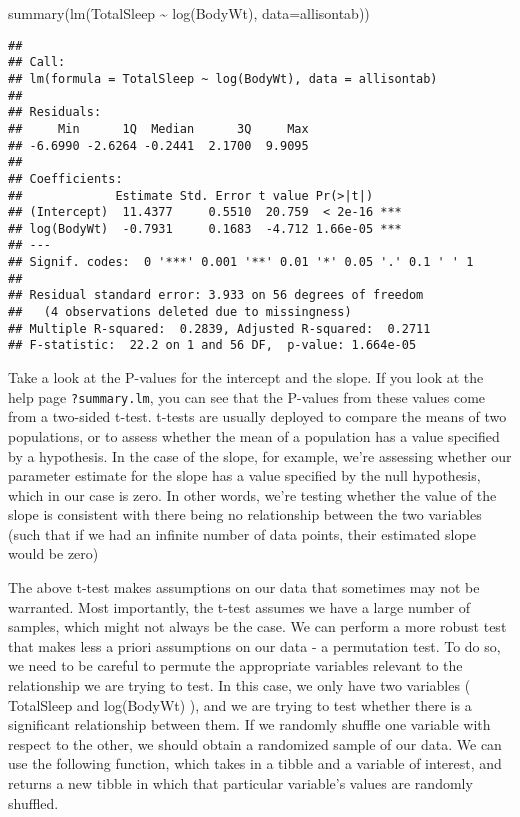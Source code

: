 \documentclass[
]{book}
\newenvironment{Shaded}{\begin{snugshade}}{\end{snugshade}}
\newcommand{\AttributeTok}[1]{\textcolor[rgb]{0.77,0.63,0.00}{#1}}
\newcommand{\FunctionTok}[1]{\textcolor[rgb]{0.00,0.00,0.00}{#1}}
\newcommand{\NormalTok}[1]{#1}
\newcommand{\SpecialCharTok}[1]{\textcolor[rgb]{0.00,0.00,0.00}{#1}}
\begin{document}
\begin{Shaded}
\begin{Highlighting}[]
\FunctionTok{summary}\NormalTok{(}\FunctionTok{lm}\NormalTok{(TotalSleep }\SpecialCharTok{\textasciitilde{}} \FunctionTok{log}\NormalTok{(BodyWt), }\AttributeTok{data=}\NormalTok{allisontab))}
\end{Highlighting}
\end{Shaded}

\begin{verbatim}
## 
## Call:
## lm(formula = TotalSleep ~ log(BodyWt), data = allisontab)
## 
## Residuals:
##     Min      1Q  Median      3Q     Max 
## -6.6990 -2.6264 -0.2441  2.1700  9.9095 
## 
## Coefficients:
##             Estimate Std. Error t value Pr(>|t|)    
## (Intercept)  11.4377     0.5510  20.759  < 2e-16 ***
## log(BodyWt)  -0.7931     0.1683  -4.712 1.66e-05 ***
## ---
## Signif. codes:  0 '***' 0.001 '**' 0.01 '*' 0.05 '.' 0.1 ' ' 1
## 
## Residual standard error: 3.933 on 56 degrees of freedom
##   (4 observations deleted due to missingness)
## Multiple R-squared:  0.2839, Adjusted R-squared:  0.2711 
## F-statistic:  22.2 on 1 and 56 DF,  p-value: 1.664e-05
\end{verbatim}

Take a look at the P-values for the intercept and the slope. If you look at the help page \texttt{?summary.lm}, you can see that the P-values from these values come from a two-sided t-test. t-tests are usually deployed to compare the means of two populations, or to assess whether the mean of a population has a value specified by a hypothesis. In the case of the slope, for example, we're assessing whether our parameter estimate for the slope has a value specified by the null hypothesis, which in our case is zero. In other words, we're testing whether the value of the slope is consistent with there being no relationship between the two variables (such that if we had an infinite number of data points, their estimated slope would be zero)

The above t-test makes assumptions on our data that sometimes may not be warranted. Most importantly, the t-test assumes we have a large number of samples, which might not always be the case. We can perform a more robust test that makes less a priori assumptions on our data - a permutation test. To do so, we need to be careful to permute the appropriate variables relevant to the relationship we are trying to test. In this case, we only have two variables ( TotalSleep and log(BodyWt) ), and we are trying to test whether there is a significant relationship between them. If we randomly shuffle one variable with respect to the other, we should obtain a randomized sample of our data. We can use the following function, which takes in a tibble and a variable of interest, and returns a new tibble in which that particular variable's values are randomly shuffled.
\end{document}
